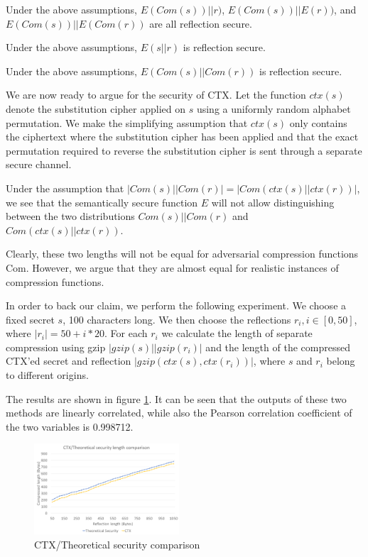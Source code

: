 \begin{lemma}
    Under the above assumptions, $E(Com(s)) || r)$, $E(Com(s)) || E(r))$, and
    $E(Com(s)) || E(Com(r))$ are all reflection secure.
\end{lemma}

\begin{lemma}
    Under the above assumptions, $E(s || r)$ is reflection secure.
\end{lemma}

\begin{lemma}
    Under the above assumptions, $E(Com(s) || Com(r))$ is reflection secure.
\end{lemma}

We are now ready to argue for the security of CTX. Let the function $ctx(s)$
denote the substitution cipher applied on $s$ using a uniformly random alphabet
permutation. We make the simplifying assumption that $ctx(s)$ only contains the
ciphertext where the substitution cipher has been applied and that the exact
permutation required to reverse the substitution cipher is sent through a
separate secure channel.

Under the assumption that $|Com(s) || Com(r)| = |Com(ctx(s) || ctx(r))|$, we
see that the semantically secure function $E$ will not allow distinguishing
between the two distributions $Com(s) || Com(r)$ and $Com(ctx(s) || ctx(r))$.

Clearly, these two lengths will not be equal for adversarial compression
functions Com. However, we argue that they are almost equal for realistic
instances of compression functions.

In order to back our claim, we perform the following experiment. We choose a
fixed secret $s$, 100 characters long. We then choose the reflections $r_i,
i\in[0, 50]$, where $|r_i| = 50 + i*20$. For each $r_i$ we calculate the
length of separate compression using gzip $|gzip(s)||gzip(r_i)|$ and the length
of the compressed CTX'ed secret and reflection $|gzip(ctx(s), ctx(r_i))|$, where $s$
and $r_i$ belong to different origins.

The results are shown in figure \ref{fig:defense_experiment}. It can be seen
that the outputs of these two methods are linearly correlated, while also the
Pearson correlation coefficient of the two variables is 0.998712.

    \begin{figure}[thpb]
        \centering
            \includegraphics[width=0.48\textwidth]{defense_experiments/ctx_experiment.png}
        \caption{CTX/Theoretical security comparison}
        \label{fig:defense_experiment}
    \end{figure}
